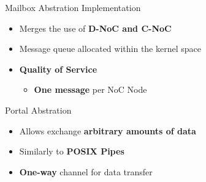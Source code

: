 		\begin{frame}[fragile]{Mailbox Abstration Implementation}
			\begin{itemize}
				\item Merges the use of \textbf{D-NoC and C-NoC}
				\item Message queue allocated within the kernel space
				\item \textbf{Quality of Service}
				\begin{itemize}
					\item \textbf{One message} per NoC Node
				\end{itemize}
			\end{itemize}


			
		\end{frame}

		\begin{frame}[fragile]{Portal Abstration}
			\begin{itemize}
				\item Allows exchange \textbf{arbitrary amounts of data} %
				\item Similarly to \textbf{POSIX Pipes}
				\item \textbf{One-way} channel for data transfer
			\end{itemize}


		\end{frame}

